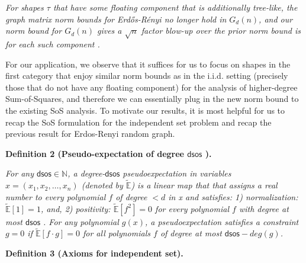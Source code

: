 \documentclass[10pt,a4paper]{article}
\begin{document}
\emph{For shapes $\tau$ that have some floating component that is additionally tree-like, the graph matrix norm bounds for Erdős-Rényi no longer hold in $G_{d}(n)$, and our norm bound for $G_{d}(n)$ gives a $\sqrt{n}$ factor blow-up over the prior norm bound is for each such component .}\par






For our application, we observe that it suffices for us to focus on shapes in the first category that enjoy similar norm bounds as in the i.i.d. setting (precisely those that do not have any floating component) for the analysis of higher-degree Sum-of-Squares, and therefore we can essentially plug in the new norm bound to the existing SoS analysis. To motivate our results, it is most helpful for us to recap the SoS formulation for the independent set problem and recap the
previous result for Erdos-Renyi random graph.\par





\par\medskip\noindent\textbf{
\textbf{Definition 2}\textbf{ }(Pseudo-expectation of degree $\mathsf{dsos}$ )\textbf{.}
}\par



\emph{For any $\mathsf{dsos}\in\mathbb{N}$, a degree-$\mathsf{dsos}$ pseudoexpectation in variables $x=(x_{1},x_{2},\dots,x_{n})$ (denoted by $\widetilde{\mathbb{E}}$) is a linear map that that assigns a real number to every polynomial $f$ of degree $<d$ in x and satisfies: 1) normalization: $\widetilde{\mathbb{E}}[1]=1$, and, 2) positivity: $\widetilde{\mathbb{E}}[f^{2}]=0$ for every polynomial $f$ with degree at most $\mathsf{dsos}$ . For any polynomial $g(x)$, a pseudoexpectation satisfies a constraint $g=0$ if $\widetilde{\mathbb{E}}[f\cdot g]=0$ for all polynomials $f$ of degree at most
$\mathsf{dsos}-deg(g)$.}\par







\par\medskip\noindent\textbf{
\textbf{Definition 3}\textbf{ }(Axioms for independent set)\textbf{.}
}\par
\end{document}
